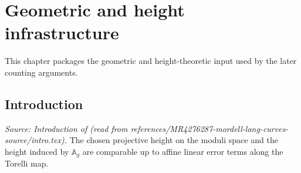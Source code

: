 \chapter{Geometric and height infrastructure}
\label{chap:basic}


This chapter packages the geometric and height-theoretic input used by the
later counting arguments.

\section{Introduction}

\begin{lemma}
  \label{lem:moduli_height_comparison}
  \textit{Source: Introduction of \cite{MR4276287-mordell-lang-curves} (read from references/MR4276287-mordell-lang-curves-source/intro.tex).}
  The chosen projective height on the moduli space and the height induced by
  \(\mathbb{A}_g\) are comparable up to affine linear error terms along the
  Torelli map.
\end{lemma}

